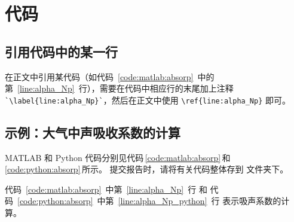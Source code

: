 \chapter{代码}

\section{引用代码中的某一行}
在正文中引用某代码（如代码~\ref{code:matlab:absorp}~中的第~\ref{line:alpha_Np}~行），需要在代码中相应行的末尾加上注释 \verb|`\label{line:alpha_Np}`|，然后在正文中使用 \verb|\ref{line:alpha_Np}| 即可。

\section{示例：大气中声吸收系数的计算}
MATLAB 和 Python 代码分别见代码\,\ref{code:matlab:absorp}\,和\,\ref{code:python:absorp}\,所示。
提交报告时，请将有关代码整体存到  文件夹下。

代码~\ref{code:matlab:absorp}~中第~\ref{line:alpha_Np}~行
和
代码~\ref{code:python:absorp}~中第~\ref{line:alpha_Np_python}~行
表示吸声系数的计算。





